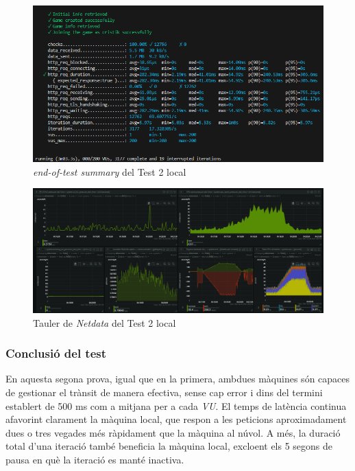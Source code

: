 \begin{figure}[!htbp]
    \includegraphics[width=1\textwidth]{Imatges/Tests/Local/2l-k6.png}  
    \caption{\textit{end-of-test summary} del Test 2 local}
\end{figure}

\begin{figure}[!htbp]
    \includegraphics[width=1\textwidth]{Imatges/Tests/Local/2l-netdata.png}  
    \caption{Tauler de \textit{Netdata} del Test 2 local}
\end{figure}

\subsubsection{Conclusió del test}

En aquesta segona prova, igual que en la primera, ambdues màquines són capaces de gestionar el trànsit de manera efectiva, sense cap error i dins del termini establert de 500 ms com a mitjana per a cada \textit{VU}. El temps de latència continua afavorint clarament la màquina local, que respon a les peticions aproximadament dues o tres vegades més ràpidament que la màquina al núvol. A més, la duració total d'una iteració també beneficia la màquina local, excloent els 5 segons de pausa en què la iteració es manté inactiva.

